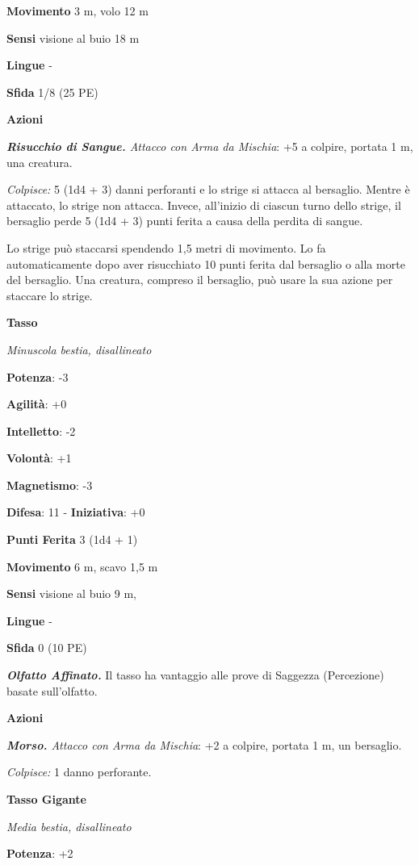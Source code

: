\begin{multicols}{2}
\textbf{Movimento} 3 m, volo 12 m

\textbf{Sensi} visione al buio 18 m

\textbf{Lingue} -

\textbf{Sfida} 1/8 (25 PE)\smallskip

\smallskip\textbf{Azioni}

\emph{\textbf{Risucchio di Sangue.} Attacco con Arma da Mischia}: +5 a
colpire, portata 1 m, una creatura.

\emph{Colpisce:} 5 (1d4 + 3) danni perforanti e lo strige si attacca al
bersaglio. Mentre è attaccato, lo strige non attacca. Invece, all'inizio
di ciascun turno dello strige, il bersaglio perde 5 (1d4 + 3) punti
ferita a causa della perdita di sangue.

Lo strige può staccarsi spendendo 1,5 metri di movimento. Lo fa
automaticamente dopo aver risucchiato 10 punti ferita dal bersaglio o
alla morte del bersaglio. Una creatura, compreso il bersaglio, può usare
la sua azione per staccare lo strige.

\textbf{Tasso}

\emph{Minuscola bestia, disallineato}

\textbf{Potenza}: -3

\textbf{Agilità}: +0

\textbf{Intelletto}: -2

\textbf{Volontà}: +1

\textbf{Magnetismo}: -3

\textbf{Difesa}: 11 - \textbf{Iniziativa}: +0

\textbf{Punti Ferita} 3 (1d4 + 1)

\textbf{Movimento} 6 m, scavo 1,5 m

\textbf{Sensi} visione al buio 9 m, 

\textbf{Lingue} -

\textbf{Sfida} 0 (10 PE)\smallskip

\emph{\textbf{Olfatto Affinato.}} Il tasso ha vantaggio alle prove di
Saggezza (Percezione) basate sull'olfatto.

\smallskip\textbf{Azioni}

\emph{\textbf{Morso.} Attacco con Arma da Mischia}: +2 a colpire,
portata 1 m, un bersaglio.

\emph{Colpisce:} 1 danno perforante.

\textbf{Tasso Gigante}

\emph{Media bestia, disallineato}

\textbf{Potenza}: +2


\end{multicols}
